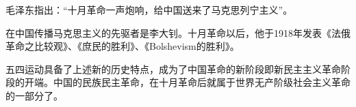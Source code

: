 毛泽东指出：{``}十月革命一声炮响，给中国送来了马克思列宁主义{''}。{}

在中国传播马克思主义的先驱者是李大钊。十月革命以后，他于{1918}年发表《法俄革命之比较观》、《庶民的胜利》、《{Bolshevism}的胜利》。

{五四运动具备了上述新的历史特点，成为了中国革命的新阶段即新民主主义革命阶段的开端。中国的民族民主革命，在十月革命后就属于世界无产阶级社会主义革命的一部分了。}
